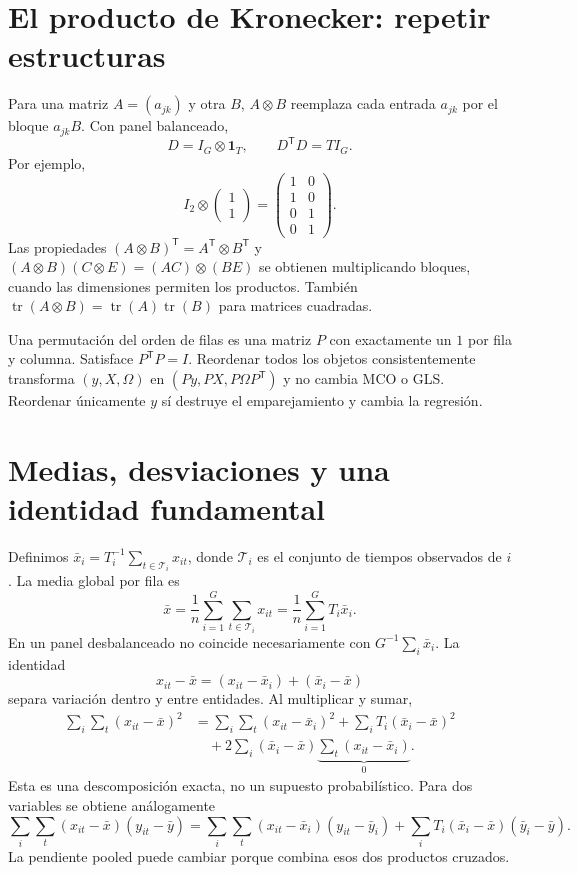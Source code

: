 \documentclass[11pt,a4paper]{article}
\newcommand{\T}{^{\mathsf T}}
\DeclareMathOperator{\tr}{tr}
\newcommand{\ones}{\mathbf 1}
\theoremstyle{definition}
\begin{document}
\section{El producto de Kronecker: repetir estructuras}
Para una matriz $A=(a_{jk})$ y otra $B$, $A\otimes B$ reemplaza cada entrada $a_{jk}$ por el bloque $a_{jk}B$. Con panel balanceado,
\[
D=I_G\otimes\ones_T,\qquad D\T D=T I_G.
\]
Por ejemplo,
\[
I_2\otimes\begin{pmatrix}1\\1\end{pmatrix}
=
\begin{pmatrix}1&0\\1&0\\0&1\\0&1\end{pmatrix}.
\]
Las propiedades $(A\otimes B)\T=A\T\otimes B\T$ y
$(A\otimes B)(C\otimes E)=(AC)\otimes(BE)$ se obtienen multiplicando bloques, cuando las dimensiones permiten los productos. También
$\tr(A\otimes B)=\tr(A)\tr(B)$ para matrices cuadradas.

Una permutación del orden de filas es una matriz $P$ con exactamente un $1$ por fila y columna. Satisface $P\T P=I$. Reordenar todos los objetos consistentemente transforma $(y,X,\Omega)$ en $(Py,PX,P\Omega P\T)$ y no cambia MCO o GLS. Reordenar únicamente $y$ sí destruye el emparejamiento y cambia la regresión.

\section{Medias, desviaciones y una identidad fundamental}
Definimos $\bar x_i=T_i^{-1}\sum_{t\in\mathcal T_i}x_{it}$, donde $\mathcal T_i$ es el conjunto de tiempos observados de $i$. La media global por fila es
\[
\bar x=\frac1n\sum_{i=1}^G\sum_{t\in\mathcal T_i}x_{it}
=\frac1n\sum_{i=1}^G T_i\bar x_i.
\]
En un panel desbalanceado no coincide necesariamente con $G^{-1}\sum_i\bar x_i$.
La identidad
\[
x_{it}-\bar x=(x_{it}-\bar x_i)+(\bar x_i-\bar x)
\]
separa variación dentro y entre entidades. Al multiplicar y sumar,
\[
\begin{aligned}
\sum_i\sum_t(x_{it}-\bar x)^2
&=\sum_i\sum_t(x_{it}-\bar x_i)^2
+\sum_i T_i(\bar x_i-\bar x)^2\\
&\quad+2\sum_i(\bar x_i-\bar x)
\underbrace{\sum_t(x_{it}-\bar x_i)}_{0}.
\end{aligned}
\]
Esta es una descomposición exacta, no un supuesto probabilístico. Para dos variables se obtiene análogamente
\[
\sum_i\sum_t(x_{it}-\bar x)(y_{it}-\bar y)
=\sum_i\sum_t(x_{it}-\bar x_i)(y_{it}-\bar y_i)
+\sum_iT_i(\bar x_i-\bar x)(\bar y_i-\bar y).
\]
La pendiente pooled puede cambiar porque combina esos dos productos cruzados.
\end{document}
